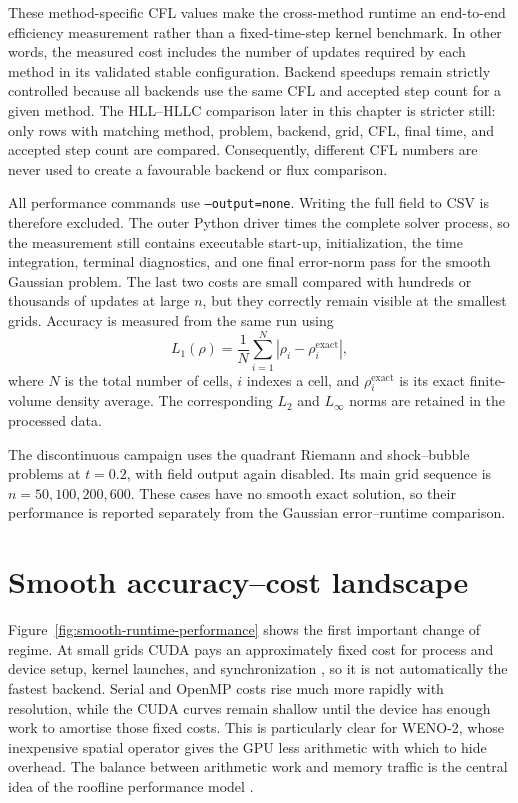 These method-specific CFL values make the cross-method runtime an end-to-end efficiency
measurement rather than a fixed-time-step kernel benchmark.  In other words, the measured
cost includes the number of updates required by each method in its validated stable
configuration.  Backend speedups remain strictly controlled because all backends use the
same CFL and accepted step count for a given method.  The HLL--HLLC comparison later in
this chapter is stricter still: only rows with matching method, problem, backend, grid,
CFL, final time, and accepted step count are compared.  Consequently, different CFL
numbers are never used to create a favourable backend or flux comparison.

All performance commands use \texttt{--output=none}. Writing the full field to CSV is
therefore excluded.  The outer Python driver times the complete solver process, so the
measurement still contains executable start-up, initialization, the time integration,
terminal diagnostics, and one final error-norm pass for the smooth Gaussian problem.  The
last two costs are small compared with hundreds or thousands of updates at large \(n\), but
they correctly remain visible at the smallest grids.  Accuracy is measured from the same
run using
\begin{equation}
  L_1(\rho)=\frac{1}{N}\sum_{i=1}^{N}
       \left|\rho_i-\rho_i^{\mathrm{exact}}\right|,
  \label{eq:performance-l1}
\end{equation}
where \(N\) is the total number of cells, \(i\) indexes a cell, and
\(\rho_i^{\mathrm{exact}}\) is its exact finite-volume density average. The
corresponding \(L_2\) and \(L_\infty\) norms are retained in the processed data.

The discontinuous campaign uses the quadrant Riemann and shock--bubble problems at
\(t=0.2\), with field output again disabled.  Its main grid sequence is
\(n=50,100,200,600\).  These cases have no smooth exact solution, so their performance is
reported separately from the Gaussian error--runtime comparison.

\section{Smooth accuracy--cost landscape}

Figure~\ref{fig:smooth-runtime-performance} shows the first important change of regime.
At small grids CUDA pays an approximately fixed cost for process and device setup, kernel
launches, and synchronization \cite{nvidia129}, so it is not automatically the fastest backend.  Serial and
OpenMP costs rise much more rapidly with resolution, while the CUDA curves remain shallow
until the device has enough work to amortise those fixed costs.  This is particularly clear
for WENO-2, whose inexpensive spatial operator gives the GPU less arithmetic with which to
hide overhead. The balance between arithmetic work and memory traffic is the central idea of
the roofline performance model \cite{williams2009}.

